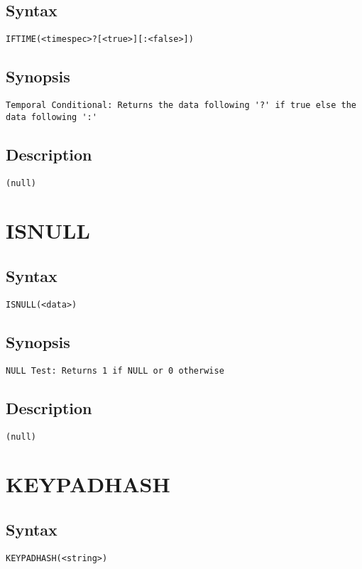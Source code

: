 \subsection{Syntax}
\begin{verbatim}
IFTIME(<timespec>?[<true>][:<false>])
\end{verbatim}
\subsection{Synopsis}
\begin{verbatim}
Temporal Conditional: Returns the data following '?' if true else the data following ':'
\end{verbatim}
\subsection{Description}
\begin{verbatim}
(null)
\end{verbatim}


\section{ISNULL}
\subsection{Syntax}
\begin{verbatim}
ISNULL(<data>)
\end{verbatim}
\subsection{Synopsis}
\begin{verbatim}
NULL Test: Returns 1 if NULL or 0 otherwise
\end{verbatim}
\subsection{Description}
\begin{verbatim}
(null)
\end{verbatim}


\section{KEYPADHASH}
\subsection{Syntax}
\begin{verbatim}
KEYPADHASH(<string>)
\end{verbatim}
